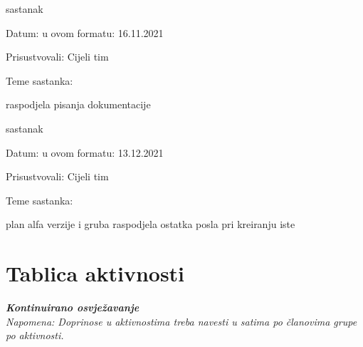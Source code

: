 \begin{packed_enum}
	\item  sastanak
	\item[] \begin{packed_item}
		\item Datum: u ovom formatu: 16.11.2021
		\item Prisustvovali: Cijeli tim
		\item Teme sastanka:
		\begin{packed_item}
			\item  raspodjela pisanja dokumentacije
		\end{packed_item}
	\end{packed_item}

	\item  sastanak
	\item[] \begin{packed_item}
		\item Datum: u ovom formatu: 13.12.2021
		\item Prisustvovali: Cijeli tim
		\item Teme sastanka:
		\begin{packed_item}
			\item  plan alfa verzije i gruba raspodjela ostatka posla pri kreiranju iste
		\end{packed_item}
	\end{packed_item}
	

			
			
		\end{packed_enum}
		
		\eject
		\section*{Tablica aktivnosti}
		
			\textbf{\textit{Kontinuirano osvježavanje}}\\
			
			 \textit{Napomena: Doprinose u aktivnostima treba navesti u satima po članovima grupe po aktivnosti.}

